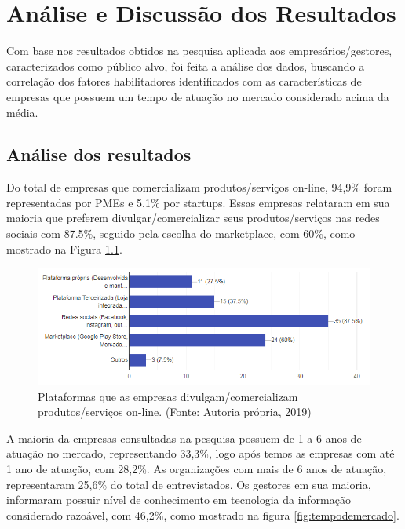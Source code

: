 \chapter{Análise e Discussão dos Resultados}
\label{cap:results}

Com base nos resultados obtidos na pesquisa aplicada aos empresários/gestores, caracterizados como público alvo, foi feita a análise dos dados, buscando a correlação dos fatores habilitadores identificados com as características de empresas que possuem um tempo de atuação no mercado considerado acima da média. 

\section{Análise dos resultados}
\label{subsec:framing}

Do total de empresas que comercializam produtos/serviços on-line, 94,9\% foram representadas por PMEs e 5.1\% por startups. Essas empresas relataram em sua maioria que preferem divulgar/comercializar seus produtos/serviços nas redes sociais com 87.5\%, seguido pela escolha do marketplace, com 60\%, como mostrado na Figura \ref{fig:plataformas}.

\begin{figure}[h]
 
\centering
\includegraphics[width=14cm]{./fig/plataformasusadas}
\caption{Plataformas que as empresas divulgam/comercializam produtos/serviços on-line. (Fonte: Autoria própria, 2019)}
\label{fig:plataformas}
\end{figure}

A maioria da empresas consultadas na pesquisa possuem de 1 a 6 anos de atuação no mercado, representando 33,3\%, logo após temos as empresas com até 1 ano de atuação, com 28,2\%. As organizações com mais de 6 anos de atuação, representaram 25,6\% do total de entrevistados. Os gestores em sua maioria, informaram possuir nível de conhecimento em tecnologia da informação considerado razoável, com 46,2\%, como mostrado na figura \ref{fig:tempodemercado}. 

